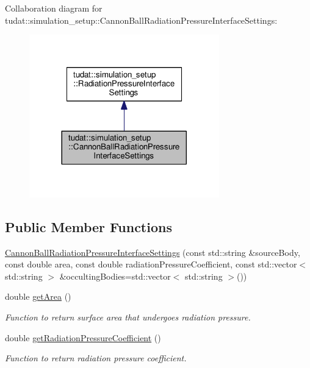 Collaboration diagram for tudat\+:\+:simulation\+\_\+setup\+:\+:Cannon\+Ball\+Radiation\+Pressure\+Interface\+Settings\+:
\nopagebreak
\begin{figure}[H]
\begin{center}
\leavevmode
\includegraphics[width=233pt]{classtudat_1_1simulation__setup_1_1CannonBallRadiationPressureInterfaceSettings__coll__graph}
\end{center}
\end{figure}
\subsection*{Public Member Functions}
\begin{DoxyCompactItemize}
\item 
\hyperlink{classtudat_1_1simulation__setup_1_1CannonBallRadiationPressureInterfaceSettings_a4cde94abffe7c2c5c594ec80c0e29f48}{Cannon\+Ball\+Radiation\+Pressure\+Interface\+Settings} (const std\+::string \&source\+Body, const double area, const double radiation\+Pressure\+Coefficient, const std\+::vector$<$ std\+::string $>$ \&occulting\+Bodies=std\+::vector$<$ std\+::string $>$())
\item 
double \hyperlink{classtudat_1_1simulation__setup_1_1CannonBallRadiationPressureInterfaceSettings_a9d6bf06bc17ed7f079137356700627d6}{get\+Area} ()
\begin{DoxyCompactList}\small\item\em Function to return surface area that undergoes radiation pressure. \end{DoxyCompactList}\item 
double \hyperlink{classtudat_1_1simulation__setup_1_1CannonBallRadiationPressureInterfaceSettings_a75fb8134e7cd9700c7e48dda33a8820d}{get\+Radiation\+Pressure\+Coefficient} ()
\begin{DoxyCompactList}\small\item\em Function to return radiation pressure coefficient. \end{DoxyCompactList}\end{DoxyCompactItemize}
